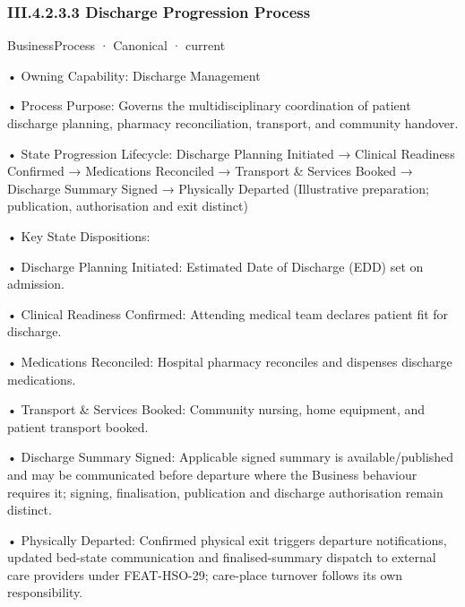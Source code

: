 \subsubsection*{III.4.2.3.3 Discharge Progression Process}
\label{navigation:III.4.2.3.3}

\label{element:7165955d9c454175a04b9ad00293f011}
{\small BusinessProcess · Canonical · current}\par

•
Owning Capability: Discharge Management



•
Process Purpose: Governs the multidisciplinary coordination of patient discharge planning, pharmacy reconciliation, transport, and community handover.



•
State Progression Lifecycle: Discharge Planning Initiated → Clinical Readiness Confirmed → Medications Reconciled → Transport \& Services Booked → Discharge Summary Signed → Physically Departed   (Illustrative preparation; publication, authorisation and exit distinct)



•
Key State Dispositions:



•
Discharge Planning Initiated: Estimated Date of Discharge (EDD) set on admission.



•
Clinical Readiness Confirmed: Attending medical team declares patient fit for discharge.



•
Medications Reconciled: Hospital pharmacy reconciles and dispenses discharge medications.



•
Transport \& Services Booked: Community nursing, home equipment, and patient transport booked.



•
Discharge Summary Signed: Applicable signed summary is available/published and may be communicated before departure where the Business behaviour requires it; signing, finalisation, publication and discharge authorisation remain distinct.



•
Physically Departed: Confirmed physical exit triggers departure notifications, updated bed-state communication and finalised-summary dispatch to external care providers under FEAT-HSO-29; care-place turnover follows its own responsibility.



